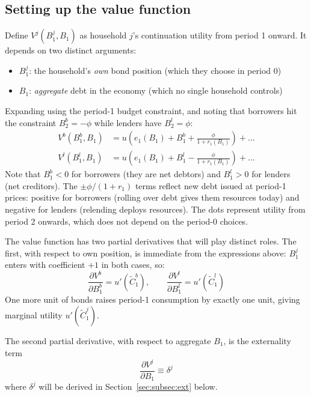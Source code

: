 \documentclass[11pt,a4paper]{article}
\begin{document}
\subsection{Setting up the value function}

Define $V^j(B_1^j, B_1)$ as household $j$'s continuation utility from period 1 onward. It depends on two distinct arguments:
\begin{itemize}
    \item $B_1^j$: the household's \textit{own} bond position (which they choose in period 0)
    \item $B_1$: \textit{aggregate} debt in the economy (which no single household controls)
\end{itemize}
Expanding using the period-1 budget constraint, and noting that borrowers hit the constraint $B_2^b = -\phi$ while lenders have $B_2^l = \phi$:
\begin{equation}
\begin{aligned}
V^b(B_1^b, B_1) &= u\!\left(e_1(B_1) + B_1^b + \frac{\phi}{1+r_1(B_1)}\right) + \ldots \\
V^l(B_1^l, B_1) &= u\!\left(e_1(B_1) + B_1^l - \frac{\phi}{1+r_1(B_1)}\right) + \ldots
\end{aligned}
\end{equation}
Note that $B_1^b < 0$ for borrowers (they are net debtors) and $B_1^l > 0$ for lenders (net creditors). The $\pm\phi/(1+r_1)$ terms reflect new debt issued at period-1 prices: positive for borrowers (rolling over debt gives them resources today) and negative for lenders (relending deploys resources). The dots represent utility from period 2 onwards, which does not depend on the period-0 choices.

The value function has two partial derivatives that will play distinct roles. The first, with respect to own position, is immediate from the expressions above: $B_1^j$ enters with coefficient $+1$ in both cases, so:
\begin{equation}
\frac{\partial V^b}{\partial B_1^b} = u'(\tilde{C}_1^b), \qquad \frac{\partial V^l}{\partial B_1^l} = u'(\tilde{C}_1^l)
\end{equation}
One more unit of bonds raises period-1 consumption by exactly one unit, giving marginal utility $u'(\tilde{C}_1^j)$. 

The second partial derivative, with respect to aggregate $B_1$, is the externality term
\begin{equation}
\frac{\partial V^j}{\partial B_1}\equiv\delta^j
\end{equation}
where $\delta^j$ will be derived in Section~\ref{sec:subsec:ext} below.
\end{document}
